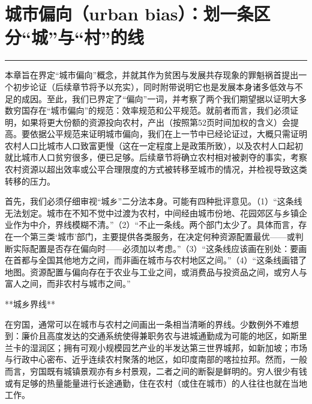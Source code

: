 \documentclass[12pt,a4paper]{article}
\begin{document}
\section{城市偏向（urban bias）：划一条区分“城”与“村”的线}
\vspace{0.5em}
\vspace{0.3em}

\noindent\rule{\textwidth}{0.4pt}

\vspace{0.3em}



本章旨在界定“城市偏向”概念，并就其作为贫困与发展共存现象的罪魁祸首提出一个初步论证（后续章节将予以充实），同时附带说明它也是发展本身诸多低效与不足的成因。至此，我们已界定了“偏向”一词，并考察了两个我们期望据以证明大多数穷国存在“城市偏向”的规范：效率规范和公平规范。就前者而言，我们必须证明，如果将更大份额的资源投向农村，产出（按照第52页时间加权的含义）会提高。要依据公平规范来证明城市偏向，我们在上一节中已经论证过，大概只需证明农村人口比城市人口致富更慢（这在一定程度上是政策所致），以及农村人口起初就比城市人口贫穷很多，便已足够。后续章节将确立农村相对被剥夺的事实，考察农村资源以超出效率或公平合理限度的方式被转移至城市的情况，并检视导致这类转移的压力。



首先，我们必须仔细审视“城乡”二分法本身。可能有四种批评意见。（1）“这条线无法划定。城市在不知不觉中过渡为农村，中间经由城市份地、花园郊区与乡镇企业作为中介，界线模糊不清。”（2）“不止一条线。两个部门太少了。具体而言，存在一个第三类‘城市’部门，主要提供各类服务，在决定何种资源配置最优——或判断实际配置是否存在偏向时——必须加以考虑。”（3）“这条线应该画在别处：要画在首都与全国其他地方之间，而非画在城市与农村地区之间。”（4）“这条线画错了地图。资源配置与偏向存在于农业与工业之间，或消费品与投资品之间，或穷人与富人之间，而非农村与城市之间。”



**城乡界线**



在穷国，通常可以在城市与农村之间画出一条相当清晰的界线。少数例外不难想到：廉价且高度发达的交通系统使得兼职务农与进城通勤成为可能的地区，如斯里兰卡的湿润区；拥有可观小规模园艺产业的半发达第三世界城邦，如新加坡；市场与行政中心密布、近乎连续农村聚落的地区，如印度南部的喀拉拉邦。然而，一般而言，穷国既有城镇景观亦有乡村景观，二者之间的断裂是鲜明的。穷人很少有钱或有足够的热量能量进行长途通勤，住在农村（或住在城市）的人往往也就在当地工作。
\end{document}
